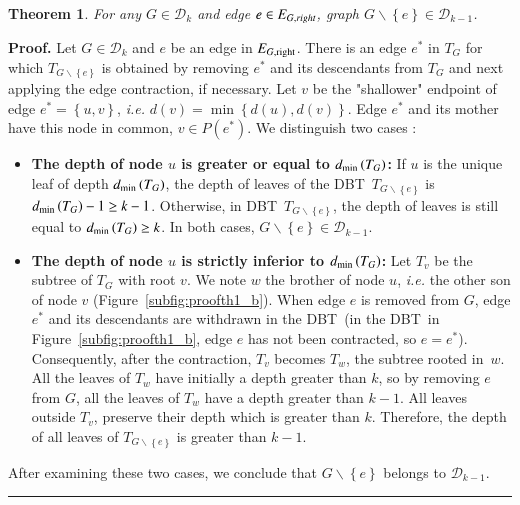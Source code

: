 \documentclass[preprint]{elsarticle}
\newtheorem{theorem}{Theorem}
\newenvironment{proof}[1][Proof]{\textbf{#1.} }{\ \rule{0.5em}{0.5em}}
\newcommand{\set}[1]{\left\{ #1 \right\}}
\newcommand{\mcald}{\mathcal{D}}
\newcommand{\ebt}{DBT}
\newcommand{\dmin}{d_{\mbox{\scriptsize{min}}}}
\newcommand{\eright}[1]{E_{#1, \mbox{\scriptsize{right}}}}
\begin{document}
\begin{theorem}
For any $G \in \mcald_k$ and edge $e \in E_{G, \emph{right}}$, graph $G \backslash \set{e} \in \mcald_{k-1}$.
\label{th:completebinary}
\end{theorem}
\begin{proof}
Let $G \in \mcald_k$ and $e$ be an edge in $\eright{G}$. There is an edge $e^*$ in $T_G$ for which $T_{G \backslash \set{e}}$ is obtained by removing $e^*$ and its descendants from $T_G$ and next applying the edge contraction, if necessary. Let $v$ be the "shallower" endpoint of edge $e^* = \set{u,v}$, {\em i.e.} $d(v) = \min \set{d(u),d(v)}$. Edge $e^*$ and its mother have this node in common, $v \in P\left(e^*\right)$. We distinguish two cases :
\begin{itemize}[leftmargin=0.3cm]
\item {\bf The depth of node $u$ is greater or equal to $\dmin\left(T_G\right)$:} If $u$ is the unique leaf of depth $\dmin\left(T_G\right)$, the depth of leaves of the \ebt ~$T_{G\backslash \set{e}}$ is $\dmin\left(T_G\right) - 1 \geq k-1$. Otherwise, in \ebt ~$T_{G\backslash \set{e}}$, the depth of leaves is still equal to $\dmin\left(T_G\right) \geq k$. In both cases, $G\backslash \set{e} \in \mcald_{k-1}$.
\item {\bf The depth of node $u$ is strictly inferior to $\dmin\left(T_G\right)$:} Let $T_v$ be the subtree of $T_G$ with root $v$. We note $w$ the brother of node $u$, {\em i.e.} the other son of node $v$ (Figure~\ref{subfig:proofth1_b}). 
When edge $e$ is removed from $G$, edge $e^*$ and its descendants are withdrawn in the \ebt ~(in the \ebt ~in Figure~\ref{subfig:proofth1_b}, edge $e$ has not been contracted, so $e = e^*$). Consequently, after the contraction, $T_v$ becomes $T_w$, the subtree rooted in~$w$. All the leaves of $T_w$ have initially a depth greater than $k$, so by removing $e$ from $G$, all the leaves of $T_w$ have a depth greater than $k-1$. All leaves outside $T_v$, preserve their depth which is greater than $k$. Therefore, the depth of all leaves of $T_{G \backslash \set{e}}$ is greater than $k-1$.
\end{itemize}
After examining these two cases, we conclude that $G\backslash \set{e}$ belongs to  
$\mcald_{k-1}$.
\end{proof}
\end{document}
